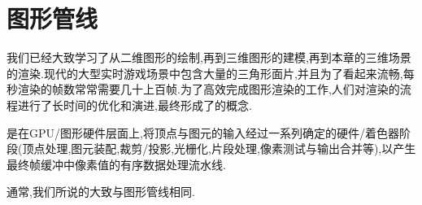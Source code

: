 \documentclass{ctexart}
\begin{document}
\section{图形管线}
我们已经大致学习了从二维图形的绘制,再到三维图形的建模,再到本章的三维场景的渲染.现代的大型实时游戏场景中包含大量的三角形面片,并且为了看起来流畅,每秒渲染的帧数常常需要几十上百帧.为了高效完成图形渲染的工作,人们对渲染的流程进行了长时间的优化和演进,最终形成了的概念.
\begin{definition}[图形管线]
    是在GPU/图形硬件层面上,将顶点与图元的输入经过一系列确定的硬件/着色器阶段(顶点处理,图元装配,裁剪/投影,光栅化,片段处理,像素测试与输出合并等),以产生最终帧缓冲中像素值的有序数据处理流水线.
\end{definition}
通常,我们所说的大致与图形管线相同.
\end{document}

